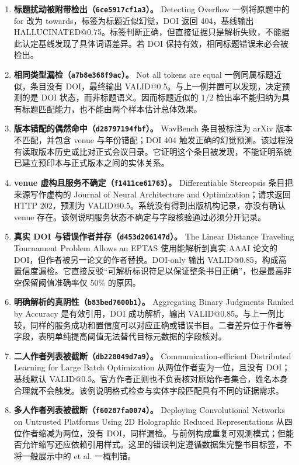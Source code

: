\documentclass[UTF8,a4paper,11pt]{ctexart}
\begin{document}
\begin{enumerate}[label=\arabic*.]
\item \textbf{标题扰动被附带检出（\texttt{6ce5917cf1a3}）。} Detecting Overflow 一例将原题中的 for 改为 towards，标签为标题近似幻觉，DOI 返回 404，基线输出 HALLUCINATED@0.75。标签判断正确，但直接证据只是解析失败，不能据此认定基线发现了具体词语差异。若 DOI 保持有效，相同标题错误未必会被检出。
\item \textbf{相同类型漏检（\texttt{a7b8e368f9ac}）。} Not all tokens are equal 一例同属标题近似，条目没有 DOI，最终输出 VALID@0.5。与上一例并置可以发现，决定预测的是 DOI 状态，而非标题语义。因而标题近似的 1/2 检出率不能归纳为具有标题匹配能力，也不能由两个样本估计总体效果。
\item \textbf{版本错配的偶然命中（\texttt{d28797194fbf}）。} WavBench 条目被标注为 arXiv 版本不匹配，并包含 venue 与年份错配；DOI 404 触发正确的幻觉预测。该过程没有读取版本历史或比对正式会议目录。它证明这个条目被发现，不能证明系统已建立预印本与正式版本之间的实体关系。
\item \textbf{venue 虚构且服务不确定（\texttt{f1411ce61763}）。} Differentiable Stereopsis 条目把来源写作虚构的 Journal of Neural Architecture and Optimization；请求返回 HTTP 202，预测为 VALID@0.5。系统没有得到出版机构记录，亦没有确认 venue 存在。该例说明服务状态不确定与字段核验通过必须分开记录。
\item \textbf{真实 DOI 与错误作者并存（\texttt{d453d206147d}）。} The Linear Distance Traveling Tournament Problem Allows an EPTAS 使用能解析到真实 AAAI 论文的 DOI，但作者被另一论文的作者替换。DOI-only 输出 VALID@0.85，构成高置信度漏检。它直接反驳“可解析标识符足以保证整条书目正确”，也是最高非空保留阈值准确率仅 50\% 的原因。
\item \textbf{明确解析的真阴性（\texttt{b83bed7600b1}）。} Aggregating Binary Judgments Ranked by Accuracy 是有效引用，DOI 成功解析，输出 VALID@0.85。与上一例比较，同样的服务成功和置信度可以对应正确或错误书目。二者差异位于作者等字段，表明单纯提高阈值无法替代目标元数据的字段核对。
\item \textbf{二人作者列表被截断（\texttt{db228049d7a9}）。} Communication-efficient Distributed Learning for Large Batch Optimization 从两位作者变为一位，且没有 DOI；基线默认 VALID@0.5。官方作者正则也不负责核对原始作者集合，姓名本身合理就不会触发。该例说明格式检查与实体字段匹配具有不同的证据需求。
\item \textbf{多人作者列表被截断（\texttt{f60287fa0074}）。} Deploying Convolutional Networks on Untrusted Platforms Using 2D Holographic Reduced Representations 从四位作者缩减为两位，没有 DOI，同样漏检。与前例构成重复可观测模式；但能否允许缩写还应依赖引用样式。这里的错误判定遵循数据集完整书目标签，不将一般展示中的 et al. 一概判错。

\end{enumerate}
\end{document}

